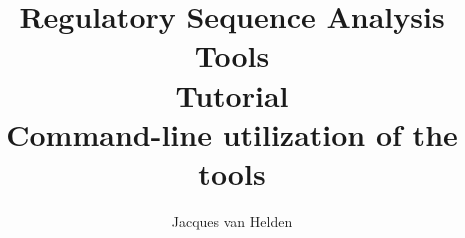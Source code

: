 \documentclass{article}
\begin{document}
\title{Regulatory Sequence Analysis Tools \\
Tutorial \\
Command-line utilization of the tools}

\author{
	Jacques van Helden \\
	 \\
	\scmb 
}

\maketitle

\newpage
\tableofcontents
\newpage

























\end{document}

